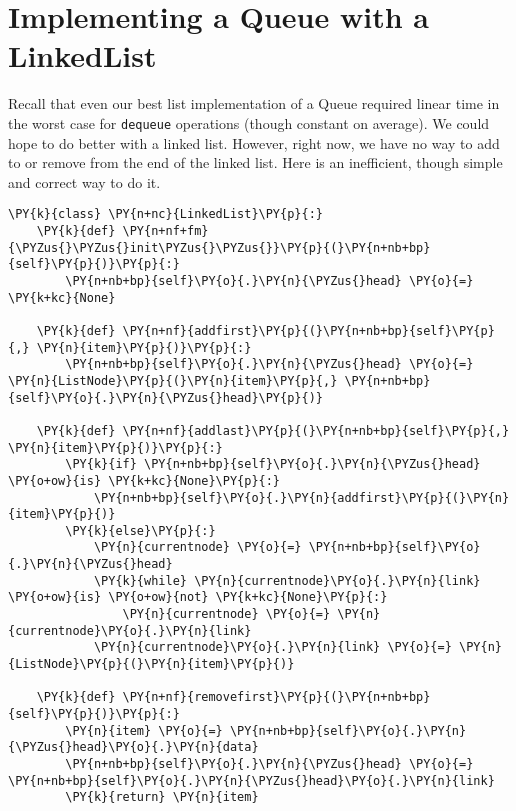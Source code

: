 \section{Implementing a Queue with a LinkedList}


Recall that even our best list implementation of a Queue required linear time in the worst case for \texttt{dequeue} operations (though constant on average).
We could hope to do better with a linked list.
However, right now, we have no way to add to or remove from the end of the linked list.
Here is an inefficient, though simple and correct way to do it.

\begin{Verbatim}[commandchars=\\\{\}]
\PY{k}{class} \PY{n+nc}{LinkedList}\PY{p}{:}
    \PY{k}{def} \PY{n+nf+fm}{\PYZus{}\PYZus{}init\PYZus{}\PYZus{}}\PY{p}{(}\PY{n+nb+bp}{self}\PY{p}{)}\PY{p}{:}
        \PY{n+nb+bp}{self}\PY{o}{.}\PY{n}{\PYZus{}head} \PY{o}{=} \PY{k+kc}{None}

    \PY{k}{def} \PY{n+nf}{addfirst}\PY{p}{(}\PY{n+nb+bp}{self}\PY{p}{,} \PY{n}{item}\PY{p}{)}\PY{p}{:}
        \PY{n+nb+bp}{self}\PY{o}{.}\PY{n}{\PYZus{}head} \PY{o}{=} \PY{n}{ListNode}\PY{p}{(}\PY{n}{item}\PY{p}{,} \PY{n+nb+bp}{self}\PY{o}{.}\PY{n}{\PYZus{}head}\PY{p}{)}

    \PY{k}{def} \PY{n+nf}{addlast}\PY{p}{(}\PY{n+nb+bp}{self}\PY{p}{,} \PY{n}{item}\PY{p}{)}\PY{p}{:}
        \PY{k}{if} \PY{n+nb+bp}{self}\PY{o}{.}\PY{n}{\PYZus{}head} \PY{o+ow}{is} \PY{k+kc}{None}\PY{p}{:}
            \PY{n+nb+bp}{self}\PY{o}{.}\PY{n}{addfirst}\PY{p}{(}\PY{n}{item}\PY{p}{)}
        \PY{k}{else}\PY{p}{:}
            \PY{n}{currentnode} \PY{o}{=} \PY{n+nb+bp}{self}\PY{o}{.}\PY{n}{\PYZus{}head}
            \PY{k}{while} \PY{n}{currentnode}\PY{o}{.}\PY{n}{link} \PY{o+ow}{is} \PY{o+ow}{not} \PY{k+kc}{None}\PY{p}{:}
                \PY{n}{currentnode} \PY{o}{=} \PY{n}{currentnode}\PY{o}{.}\PY{n}{link}
            \PY{n}{currentnode}\PY{o}{.}\PY{n}{link} \PY{o}{=} \PY{n}{ListNode}\PY{p}{(}\PY{n}{item}\PY{p}{)}

    \PY{k}{def} \PY{n+nf}{removefirst}\PY{p}{(}\PY{n+nb+bp}{self}\PY{p}{)}\PY{p}{:}
        \PY{n}{item} \PY{o}{=} \PY{n+nb+bp}{self}\PY{o}{.}\PY{n}{\PYZus{}head}\PY{o}{.}\PY{n}{data}
        \PY{n+nb+bp}{self}\PY{o}{.}\PY{n}{\PYZus{}head} \PY{o}{=} \PY{n+nb+bp}{self}\PY{o}{.}\PY{n}{\PYZus{}head}\PY{o}{.}\PY{n}{link}
        \PY{k}{return} \PY{n}{item}


\end{Verbatim}
